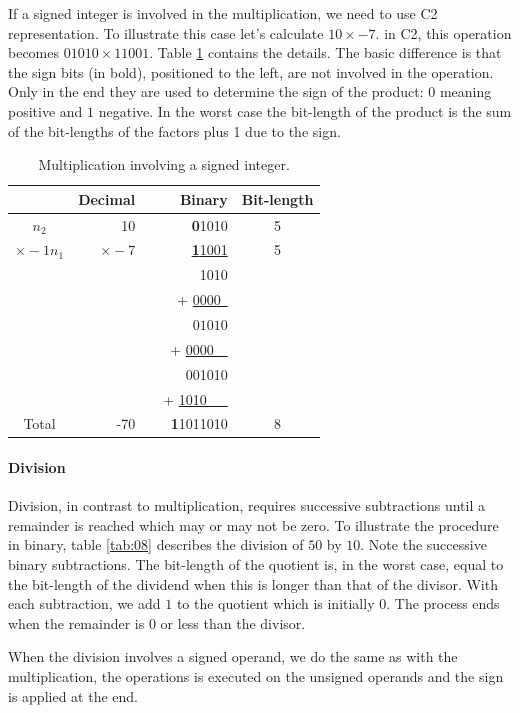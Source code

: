 \documentclass[10pt]{article}
\begin{document}
If a signed integer is involved in the multiplication, we need to use C2
representation. To illustrate this case let's calculate $10\times-7$. in C2,
this operation becomes $01010\times11001$. Table \ref{tab:07} contains the
details. The basic difference is that the sign bits (in bold), positioned to
the left, are not involved in the operation. Only in the end they are used to
determine the sign of the product: $0$ meaning positive and $1$ negative. In
the worst case the bit-length of the product is the sum of the bit-lengths of
the factors plus 1 due to the sign.

\begin{table}[ht]
    \centering
    \caption{Multiplication involving a signed integer.}
    \begin{tabular}{crrrc}
    \hline
    	  & Decimal & & Binary & Bit-length \\
    \hline      
    $n_2$ & 10	& & \textbf{0}1010 & 5 \\
    $\times -1n_1$ & \underline{$\times -7$} & & \underline{\textbf{1}1001} & 5
\\
    & & & 1010  & \\
    & & & + \underline{0000\ } & \\
    & & & $\,01010$ & \\
    & & & + \underline{0000\ \ } & \\
    & & & 001010 & \\
    & & & + \underline{1010\ \ \ } & \\
    Total& -70 & & \textbf{1}1011010 & 8\\
    \hline
	\end{tabular}
    \label{tab:07}
\end{table}

\paragraph{Division}
Division, in contrast to multiplication, requires successive subtractions until
a remainder is reached which may or may not be zero. To illustrate the
procedure in binary, table \ref{tab:08} describes the division of $50$ by $10$.
Note the successive binary subtractions. The bit-length of the quotient is, in
the worst case, equal to the bit-length of the dividend when this is longer
than that of the divisor. With each subtraction, we add $1$ to the quotient
which is initially $0$. The process ends when the remainder is $0$ or less than
the divisor.

When the division involves a signed operand, we do the same as with the
multiplication, the operations is executed on the unsigned operands and the
sign is applied at the end.
\end{document}
